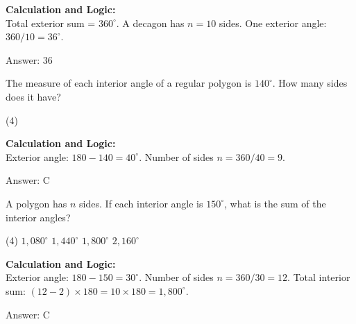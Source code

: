 \documentclass[11pt,paper=a4,answers]{exam}
\begin{document}
\begin{questions}
\begin{solution}
\textbf{Calculation and Logic:} \\
Total exterior sum = $360^\circ$. A decagon has $n = 10$ sides. One exterior angle: $360 / 10 = 36^\circ$.

\vspace{30pt}

Answer: \colorbox{yellow!100}{36}
\end{solution}

\vspace{60pt}

\question
The measure of each interior angle of a regular polygon is $140^\circ$. How many sides does it have?
\begin{tasks}(4)
\end{tasks}

\begin{solution}
\textbf{Calculation and Logic:} \\
Exterior angle: $180 - 140 = 40^\circ$. Number of sides $n = 360 / 40 = 9$.

\vspace{30pt}

Answer: \colorbox{yellow!100}{C}
\end{solution}

\vspace{60pt}

\question
A polygon has $n$ sides. If each interior angle is $150^\circ$, what is the sum of the interior angles?
\begin{tasks}(4)
    \task $1,080^\circ$
    \task $1,440^\circ$
    \task $1,800^\circ$
    \task $2,160^\circ$
\end{tasks}

\begin{solution}
\textbf{Calculation and Logic:} \\
Exterior angle: $180 - 150 = 30^\circ$. Number of sides $n = 360 / 30 = 12$. Total interior sum: $(12 - 2) \times 180 = 10 \times 180 = 1,800^\circ$.

\vspace{30pt}

Answer: \colorbox{yellow!100}{C}
\end{solution}

\vspace{60pt}


\end{questions}
\end{document}
